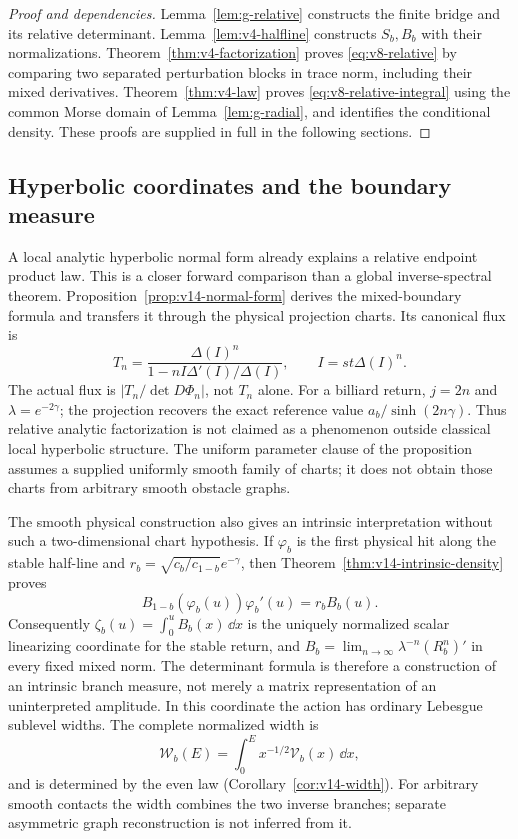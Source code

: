 \begin{proof}[Proof and dependencies]
Lemma~\ref{lem:g-relative} constructs the finite bridge and its relative
determinant. Lemma~\ref{lem:v4-halfline} constructs $S_b,B_b$ with their
normalizations. Theorem~\ref{thm:v4-factorization} proves
\eqref{eq:v8-relative} by comparing two separated perturbation blocks in
trace norm, including their mixed derivatives. Theorem~\ref{thm:v4-law}
proves \eqref{eq:v8-relative-integral} using the common Morse domain of
Lemma~\ref{lem:g-radial}, and identifies the conditional density.
These proofs are supplied in full in the following sections.
\end{proof}

\subsection{Hyperbolic coordinates and the boundary measure}
\label{sec:v14-forward-position}
A local analytic hyperbolic normal form already explains a relative
endpoint product law. This is a closer forward comparison than a global
inverse-spectral theorem. Proposition~\ref{prop:v14-normal-form} derives
the mixed-boundary formula and transfers it through the physical
projection charts. Its canonical flux is
\[
 T_n=\frac{\Delta(I)^n}{1-nI\Delta'(I)/\Delta(I)},
 \qquad I=st\Delta(I)^n.
\]
The actual flux is $|T_n/\det D\Phi_n|$, not $T_n$ alone. For a
billiard return, $j=2n$ and $\lambda=e^{-2\gamma}$; the projection
recovers the exact reference value $a_b/\sinh(2n\gamma)$. Thus
relative analytic factorization is not claimed as a phenomenon outside
classical local hyperbolic structure. The uniform parameter clause of
the proposition assumes a supplied uniformly smooth family of charts;
it does not obtain those charts from arbitrary smooth obstacle graphs.

The smooth physical construction also gives an intrinsic interpretation
without such a two-dimensional chart hypothesis. If $\varphi_b$ is
the first physical hit along the stable half-line and
$r_b=\sqrt{c_b/c_{1-b}}e^{-\gamma}$, then
Theorem~\ref{thm:v14-intrinsic-density} proves
\[
 B_{1-b}(\varphi_b(u))\varphi_b'(u)=r_b B_b(u).
\]
Consequently $\zeta_b(u)=\int_0^uB_b(x)\,\dd x$ is the uniquely
normalized scalar linearizing coordinate for the stable return, and
$B_b=\lim_{n\to\infty}\lambda^{-n}(R_b^n)'$ in every fixed
mixed norm. The determinant formula is therefore a construction of an
intrinsic branch measure, not merely a matrix representation of an
uninterpreted amplitude. In this coordinate the action has ordinary
Lebesgue sublevel widths. The complete normalized width is
\[
 \mathcal W_b(E)=\int_0^E x^{-1/2}\mathcal V_b(x)\,\dd x,
\]
and is determined by the even law
(Corollary~\ref{cor:v14-width}). For arbitrary smooth contacts the
width combines the two inverse branches; separate asymmetric graph
reconstruction is not inferred from it.

